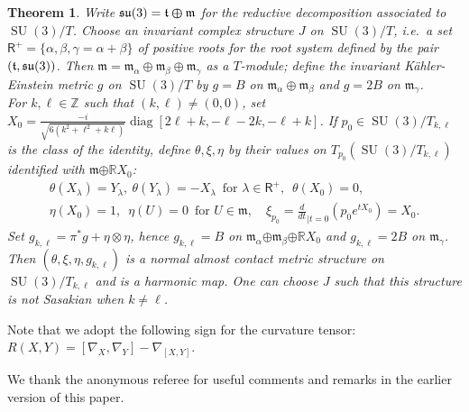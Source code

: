 \documentclass[a4paper,reqno]{amsart}
\theoremstyle{definition}
\theoremstyle{remark}
\theoremstyle{plain}
\newtheorem{mainthm}{Theorem}
\numberwithin{equation}{section}
\newcommand{\R}{{\mathbb{R}}}
\newcommand{\Z}{{\mathbb{Z}}}
\newcommand{\fm}{{\mathfrak{m}}}
\newcommand{\ft}{{\mathfrak{t}}}
\def\SU{\operatorname {SU}}
\def\diag{\operatorname {diag}}
\def\boplus{\mathbin{\boldsymbol{\oplus}}}
\newcommand{\proots}{\mathsf{R}^+}
\newcommand{\pzero}{{p_0}}
\begin{document}
\begin{mainthm}
  \label{thmB}
  Write $\su(3) = \ft \boplus \fm$ for the reductive
  decomposition associated to $\SU(3)/T$. Choose an invariant
  complex structure $J$ on $\SU(3)/T$, i.e.~a set
  $\proots = \{\alpha, \beta, \gamma =\alpha+\beta\}$ of positive
  roots for the root system defined by the pair $(\ft,\su(3))$.
  Then $\fm= \fm_\alpha \oplus  \fm_\beta \oplus \fm_\gamma$ as a $T$-module; 
  define the invariant K\"ahler-Einstein metric
  $g$  on $\SU(3)/T$ by $g= B$ on
  $\fm_\alpha \oplus \fm_\beta$ and $g= 2B$ on $\fm_\gamma$.
  \\
  For $k,\ell \in \Z$ such that $(k,\ell) \neq (0,0)$, set
  $X_0 = \frac{-i}{\sqrt{6(k^2 + \ell^2 +k \ell)}} \diag[2\ell+
  k, -\ell - 2k, - \ell +k]$. If $\pzero \in \SU(3)/T_{k,\ell}$ is the class of the
  identity, define $\theta, \xi, \eta$ by their values on
  $T_{\pzero}(\SU(3)/T_{k,\ell})$ identified with
  $\fm \boplus \R X_0$:
     \begin{gather*}
       \theta(X_\lambda) = Y_\lambda, \  \theta(Y_\lambda)  = -
       X_\lambda \ \; \text{for $\lambda \in \proots$},
       \ \; \theta(X_0) = 0,
       \\
       \eta(X_0)= 1, \ \; \eta(U) = 0 \ \; \text{for $U \in
         \fm$},  \quad \xi_{\pzero} = \frac{d}{dt}_{\mid t
         = 0}(\pzero e^{tX_0})= X_0.
     \end{gather*}
Set $g_{k,\ell} = \pi^*
g + \eta \otimes \eta$, hence
$g_{k,\ell}  = B$ on $\fm_\alpha
\boplus \fm_\beta \boplus \R X_0$ and
$g_{k,\ell} = 2B$ on $\fm_\gamma$. \\
Then $(\theta,\xi,\eta,g_{k,\ell})$ is a normal almost contact
metric structure on $\SU(3)/T_{k,\ell}$ and is a harmonic
map. One can choose $J$ such that  this structure is not Sasakian when $k \ne \ell$.
\end{mainthm}





Note that we adopt the %
following sign for the curvature
tensor: $R(X,Y)= [\nabla_{X},\nabla_{Y}] - \nabla_{[X,Y]}$.


We thank the anonymous referee for useful comments and remarks in the earlier version of this paper.

\end{document}
